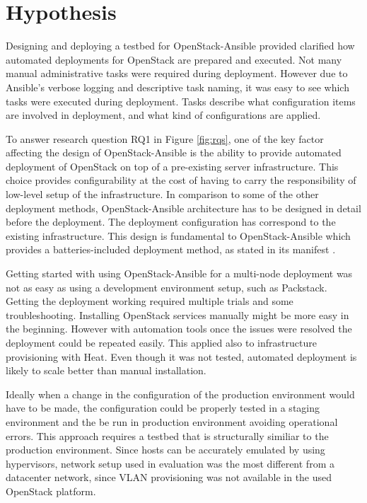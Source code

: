 \documentclass[officiallayout]{tktla}
\begin{document}
\section{Hypothesis}

Designing and deploying a testbed for OpenStack-Ansible provided clarified how
automated deployments for OpenStack are prepared and executed. Not many manual
administrative tasks were required during deployment. However due to Ansible's
verbose logging and descriptive task naming, it was easy to see which tasks
were executed during deployment. Tasks describe what configuration items are
involved in deployment, and what kind of configurations are applied.

To answer research question RQ1 in Figure \ref{fig:rqs}, one of the key factor
affecting the design of OpenStack-Ansible is the ability to provide automated
deployment of OpenStack on top of a pre-existing server infrastructure. This
choice provides configurability at the cost of having to carry the
responsibility of low-level setup of the infrastructure. In comparison to some
of the other deployment methods, OpenStack-Ansible architecture has to be
designed in detail before the deployment. The deployment configuration has
correspond to the existing infrastructure. This design is fundamental to
OpenStack-Ansible which provides a batteries-included deployment method, as
stated in its manifest \cite{openstack-ansible}.

Getting started with using OpenStack-Ansible for a multi-node deployment was
not as easy as using a development environment setup, such as Packstack.
Getting the deployment working required multiple trials and some
troubleshooting. Installing OpenStack services manually might be more easy in
the beginning. However with automation tools once the issues were resolved the
deployment could be repeated easily. This applied also to infrastructure
provisioning with Heat. Even though it was not tested, automated deployment is
likely to scale better than manual installation.

Ideally when a change in the configuration of the production environment would
have to be made, the configuration could be properly tested in a staging
environment and the be run in production environment avoiding operational
errors. This approach requires a testbed that is structurally similiar to the
production environment. Since hosts can be accurately emulated by using
hypervisors, network setup used in evaluation was the most different from a
datacenter network, since VLAN provisioning was not available in the used
OpenStack platform.
\end{document}
